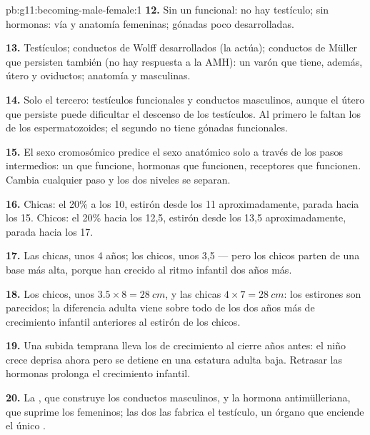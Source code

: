 \begin{solution}{pb:g11:becoming-male-female:1}
\textbf{12.} Sin un  funcional: no hay testículo; sin hormonas: vía
y anatomía femeninas; gónadas poco desarrolladas.

\textbf{13.} Testículos; conductos de Wolff desarrollados (la
 actúa); conductos de Müller que persisten también (no hay
respuesta a la AMH): un varón que tiene, además, útero y oviductos;
anatomía y  masculinas.

\textbf{14.} Solo el tercero: testículos funcionales y conductos
masculinos, aunque el útero que persiste puede dificultar el descenso
de los testículos. Al primero le faltan los  de los
espermatozoides; el segundo no tiene gónadas funcionales.

\textbf{15.} El sexo cromosómico predice el sexo anatómico solo a
través de los pasos intermedios: un  que funcione, hormonas que
funcionen, receptores que funcionen. Cambia cualquier paso y los dos
niveles se separan.

\textbf{16.} Chicas: el 20\% a los 10, estirón desde los 11
aproximadamente, parada hacia los 15. Chicos: el 20\% hacia los 12,5,
estirón desde los 13,5 aproximadamente, parada hacia los 17.

\textbf{17.} Las chicas, unos 4 años; los chicos, unos 3,5 --- pero los
chicos parten de una base más alta, porque han crecido al ritmo
infantil dos años más.

\textbf{18.} Los chicos, unos $3.5 \times 8 = \qty{28}{cm}$, y las
chicas $4 \times
7 = \qty{28}{cm}$: los estirones son parecidos; la
diferencia adulta viene sobre todo de los dos años más de crecimiento
infantil anteriores al estirón de los chicos.

\textbf{19.} Una subida temprana lleva los  de crecimiento al
cierre años antes: el niño crece deprisa ahora pero se detiene en una
estatura adulta baja. Retrasar las hormonas prolonga el crecimiento
infantil.

\textbf{20.} La , que construye los conductos masculinos, y
la hormona antimülleriana, que suprime los femeninos; las dos las
fabrica el testículo, un órgano que enciende el único .
\end{solution}
